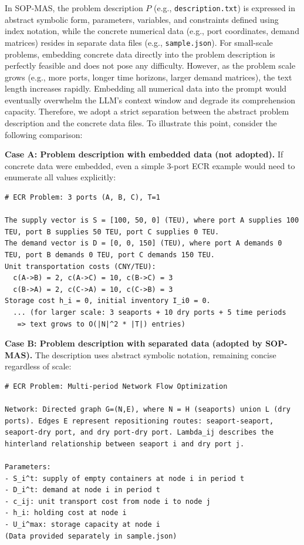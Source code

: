 \documentclass[11pt,a4paper]{article}
\begin{document}
In SOP-MAS, the problem description $P$ (e.g., \texttt{description.txt}) is expressed in abstract symbolic form, parameters, variables, and constraints defined using index notation, while the concrete numerical data (e.g., port coordinates, demand matrices) resides in separate data files (e.g., \texttt{sample.json}). For small-scale problems, embedding concrete data directly into the problem description is perfectly feasible and does not pose any difficulty. However, as the problem scale grows (e.g., more ports, longer time horizons, larger demand matrices), the text length increases rapidly. Embedding all numerical data into the prompt would eventually overwhelm the LLM's context window and degrade its comprehension capacity. Therefore, we adopt a strict separation between the abstract problem description and the concrete data files. To illustrate this point, consider the following comparison:

\medskip
\noindent\textbf{Case A: Problem description with embedded data (not adopted).} If concrete data were embedded, even a simple 3-port ECR example would need to enumerate all values explicitly:

\begin{promptbox}
\begin{lstlisting}[style=prompttemplate]
# ECR Problem: 3 ports (A, B, C), T=1

The supply vector is S = [100, 50, 0] (TEU), where port A supplies 100 TEU, port B supplies 50 TEU, port C supplies 0 TEU.
The demand vector is D = [0, 0, 150] (TEU), where port A demands 0 TEU, port B demands 0 TEU, port C demands 150 TEU.
Unit transportation costs (CNY/TEU):
  c(A->B) = 2, c(A->C) = 10, c(B->C) = 3
  c(B->A) = 2, c(C->A) = 10, c(C->B) = 3
Storage cost h_i = 0, initial inventory I_i0 = 0.
  ... (for larger scale: 3 seaports + 10 dry ports + 5 time periods
   => text grows to O(|N|^2 * |T|) entries)
\end{lstlisting}
\end{promptbox}

\noindent\textbf{Case B: Problem description with separated data (adopted by SOP-MAS).} The description uses abstract symbolic notation, remaining concise regardless of scale:

\begin{promptbox}
\begin{lstlisting}[style=prompttemplate]
# ECR Problem: Multi-period Network Flow Optimization

Network: Directed graph G=(N,E), where N = H (seaports) union L (dry ports). Edges E represent repositioning routes: seaport-seaport, seaport-dry port, and dry port-dry port. Lambda_ij describes the hinterland relationship between seaport i and dry port j.

Parameters:
- S_i^t: supply of empty containers at node i in period t
- D_i^t: demand at node i in period t
- c_ij: unit transport cost from node i to node j
- h_i: holding cost at node i
- U_i^max: storage capacity at node i
(Data provided separately in sample.json)
\end{lstlisting}
\end{promptbox}
\end{document}
